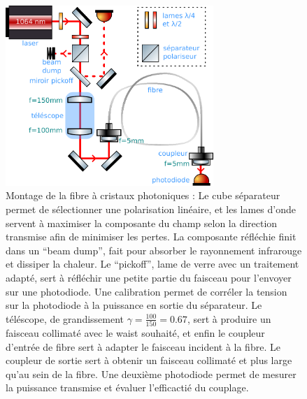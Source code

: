 \documentclass[11pt,a4paper] { article}
\begin{document}
\begin{figure}[h]
	\centering
	\includegraphics[width=0.7\textwidth]{./img/schema couplage.pdf}
	\caption[Montage de la fibre à cristaux photoniques]{Montage de la fibre à cristaux photoniques :
	\small Le cube séparateur permet de sélectionner une polarisation linéaire, et les lames d'onde servent à maximiser la composante du champ selon la direction transmise afin de minimiser les pertes. La composante réfléchie finit dans un ``beam dump'', fait pour absorber le rayonnement infrarouge et dissiper la chaleur. Le ``pickoff'', lame de verre avec un traitement adapté, sert à réfléchir une petite partie du faisceau pour l'envoyer sur une photodiode. Une calibration permet de corréler la tension sur la photodiode à la puissance en sortie du séparateur. Le téléscope, de grandissement $\gamma = \frac{100}{150} = 0.67$, sert à produire un faisceau collimaté avec le waist souhaité, et enfin le coupleur d'entrée de fibre sert à adapter le faisceau incident à la fibre. Le coupleur de sortie sert à obtenir un faisceau collimaté et plus large qu'au sein de la fibre. Une deuxième photodiode permet de mesurer la puissance transmise et évaluer l'efficactié du couplage.}
	\label{fig:couplage}
\end{figure}
\end{document}
